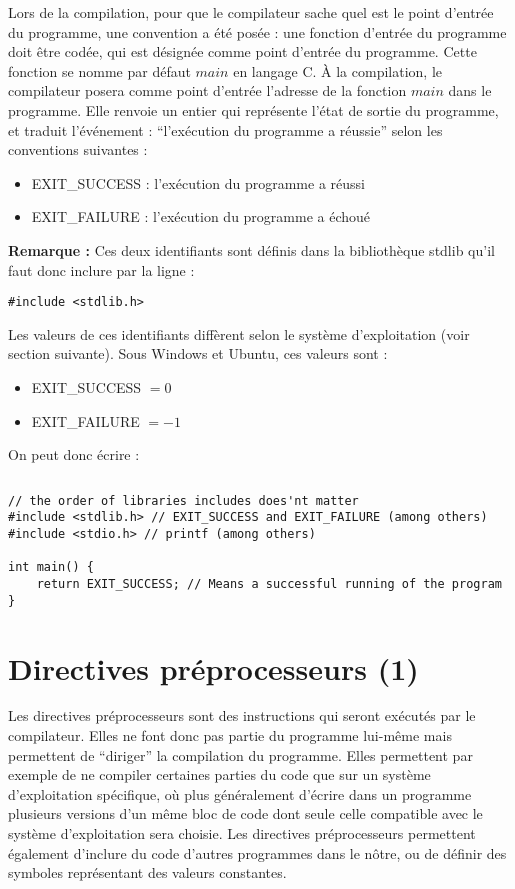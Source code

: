 \documentclass[../../../main.tex]{subfiles}
\begin{document}
Lors de la compilation, pour que le compilateur sache quel est le point d'entrée du programme, une convention a été posée : une fonction d'entrée du programme doit être codée, qui est désignée comme point d'entrée du programme. Cette fonction se nomme par défaut $main$ en langage C. À la compilation, le compilateur posera comme point d'entrée l'adresse de la fonction $main$ dans le programme. Elle renvoie un entier qui représente l'état de sortie du programme, et traduit l'événement : ``l'exécution du programme a réussie'' selon les conventions suivantes :
\begin{itemize}
	\item \textsf{EXIT\_SUCCESS} : l'exécution du programme a réussi
	\item \textsf{EXIT\_FAILURE} : l'exécution du programme a échoué
\end{itemize}
\textbf{Remarque :} Ces deux identifiants sont définis dans la bibliothèque \textsf{stdlib} qu'il faut donc inclure par la ligne :
\begin{verbatim}
#include <stdlib.h>
\end{verbatim}
Les valeurs de ces identifiants diffèrent selon le système d'exploitation (voir section suivante). Sous Windows et Ubuntu, ces valeurs sont :
\begin{itemize}
	\item \textsf{EXIT\_SUCCESS} $ = 0$
	\item \textsf{EXIT\_FAILURE} $ = -1$
\end{itemize}
On peut donc écrire :
\begin{lstlisting}[title=Exemple]
\end{lstlisting}
\begin{verbatim}
// the order of libraries includes does'nt matter
#include <stdlib.h> // EXIT_SUCCESS and EXIT_FAILURE (among others)
#include <stdio.h> // printf (among others)

int main() {
	return EXIT_SUCCESS; // Means a successful running of the program
}
\end{verbatim}
\section{Directives préprocesseurs (1)}
Les directives préprocesseurs sont des instructions qui seront exécutés par le compilateur. Elles ne font donc pas partie du programme lui-même mais permettent de ``diriger'' la compilation du programme. Elles permettent par exemple de ne compiler certaines parties du code que sur un système d'exploitation spécifique, où plus généralement d'écrire dans un programme plusieurs versions d'un même bloc de code dont seule celle compatible avec le système d'exploitation sera choisie. Les directives préprocesseurs permettent également d'inclure du code d'autres programmes dans le nôtre, ou de définir des symboles représentant des valeurs constantes.
 
\end{document}
